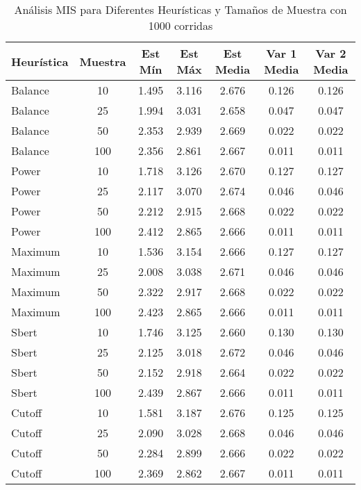 \documentclass{article}
\begin{document}
\begin{table}[h!]
    \centering
    \footnotesize
    \caption{Análisis MIS para Diferentes Heurísticas y Tamaños de Muestra con 1000 corridas}
    \label{tab:analisis}
    \begin{tabular}{lcccccc}
        \toprule
        Heurística & Muestra & Est Mín & Est Máx & Est Media & Var 1 Media & Var 2 Media \\
        \midrule
        Balance & 10 & 1.495 & 3.116 & 2.676 & 0.126 & 0.126 \\
        Balance & 25 & 1.994 & 3.031 & 2.658 & 0.047 & 0.047 \\
        Balance & 50 & 2.353 & 2.939 & 2.669 & 0.022 & 0.022 \\
        Balance & 100 & 2.356 & 2.861 & 2.667 & 0.011 & 0.011 \\
        \addlinespace
        Power & 10 & 1.718 & 3.126 & 2.670 & 0.127 & 0.127 \\
        Power & 25 & 2.117 & 3.070 & 2.674 & 0.046 & 0.046 \\
        Power & 50 & 2.212 & 2.915 & 2.668 & 0.022 & 0.022 \\
        Power & 100 & 2.412 & 2.865 & 2.666 & 0.011 & 0.011 \\
        \addlinespace
        Maximum & 10 & 1.536 & 3.154 & 2.666 & 0.127 & 0.127 \\
        Maximum & 25 & 2.008 & 3.038 & 2.671 & 0.046 & 0.046 \\
        Maximum & 50 & 2.322 & 2.917 & 2.668 & 0.022 & 0.022 \\
        Maximum & 100 & 2.423 & 2.865 & 2.666 & 0.011 & 0.011 \\
        \addlinespace
        Sbert & 10 & 1.746 & 3.125 & 2.660 & 0.130 & 0.130 \\
        Sbert & 25 & 2.125 & 3.018 & 2.672 & 0.046 & 0.046 \\
        Sbert & 50 & 2.152 & 2.918 & 2.664 & 0.022 & 0.022 \\
        Sbert & 100 & 2.439 & 2.867 & 2.666 & 0.011 & 0.011 \\
        \addlinespace
        Cutoff & 10 & 1.581 & 3.187 & 2.676 & 0.125 & 0.125 \\
        Cutoff & 25 & 2.090 & 3.028 & 2.668 & 0.046 & 0.046 \\
        Cutoff & 50 & 2.284 & 2.899 & 2.666 & 0.022 & 0.022 \\
        Cutoff & 100 & 2.369 & 2.862 & 2.667 & 0.011 & 0.011 \\
        \bottomrule
    \end{tabular}
\end{table}
\end{document}
